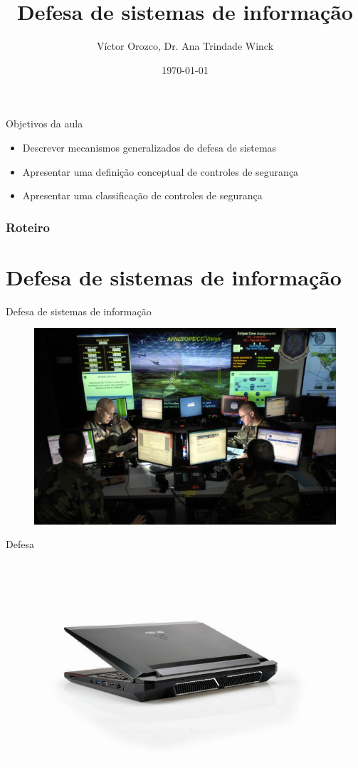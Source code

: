 \documentclass{beamer}
\title{Defesa de sistemas de informação}
\author[Lopez. V.L.O, Winck. A. T]{Víctor Orozco, Dr. Ana Trindade Winck}
\institute[UFSM]{
  Centro de Tecnologia \\
  Universidade Federal de Santa Maria
}
\date{\today}
\begin{document}
\begin{frame}[Plain]
\titlepage
\end{frame}

\begin{frame}{Objetivos da aula}
\begin{itemize}
\item Descrever mecanismos generalizados de defesa de sistemas
\item Apresentar uma definição conceptual de controles de segurança
\item Apresentar uma classificação de controles de segurança
\end{itemize}
\end{frame}

\begin{frame}
\frametitle{Roteiro}
\tableofcontents
\end{frame}

\section{Defesa de sistemas de informação}
\begin{frame}{Defesa de sistemas de informação}
\begin{figure}[tbph]
\centering
\includegraphics[width=0.7\linewidth]{./CyberCommand}
\label{fig:CyberCommand}
\end{figure}
\end{frame}

\begin{frame}{Defesa}
\begin{figure}[tbph]
\centering
\includegraphics[width=0.7\linewidth]{./laptop}
\label{fig:laptop}
\end{figure}
\end{frame}
\end{document}
